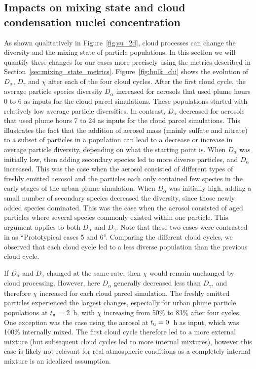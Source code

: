 \documentclass[edeposit,fullpage]{uiucthesis2009}
\begin{document}
\subsection{Impacts on mixing state and cloud condensation nuclei concentration}
As shown qualitatively in Figure~\ref{fig:su_2d}, cloud processes can
change the diversity and the mixing state of particle populations. In
this section we will quantify these changes for our cases more
precisely using the metrics described in
Section~\ref{sec:mixing_state_metrics}. Figure~\ref{fig:bulk_chi}
shows the evolution of $D_\alpha$, $D_\gamma$ and $\chi$ after each of
the four cloud cycles. After the first cloud cycle, the average
particle species diversity $D_\alpha$ increased for aerosols that used
plume hours 0 to 6 as inputs for the cloud parcel simulations. These
populations started with relatively low average particle
diversities. In contrast, $D_\alpha$ decreased for aerosols that used
plume hours 7 to 24 as inputs for the cloud parcel simulations. This
illustrates the fact that the addition of aerosol mass (mainly sulfate
and nitrate) to a subset of particles in a population can lead to a
decrease or increase in average particle diversity, depending on what
the starting point is. When $D_{\alpha}$ was initially low, then
adding secondary species led to more diverse particles, and
$D_{\alpha}$ increased.  This was the case when the aerosol consisted
of different types of freshly emitted aerosol and the particles each
only contained few species in the early stages of the urban plume
simulation. When $D_{\alpha}$ was initially high, adding a small
number of secondary species decreased the diversity, since those newly
added species dominated. This was the case when the aerosol consisted
of aged particles where several species commonly existed within one
particle. This argument applies to both $D_{\alpha}$ and
$D_{\gamma}$. Note that these two cases were contrasted in
\citet{Riemer2013a} as ``Prototypical cases 5 and 6''.  Comparing the
different cloud cycles, we observed that each cloud cycle led to a
less diverse population than the previous cloud cycle.

If $D_{\alpha}$ and $D_{\gamma}$ changed at the same rate, then $\chi$
would remain unchanged by cloud processing. However, here $D_{\alpha}$
generally decreased less than $D_{\gamma}$, and therefore $\chi$
increased for each cloud parcel simulation. The freshly emitted
particles experienced the largest changes, especially for urban plume
particle populations at $t_{\rm u}$ = 2~h, with $\chi$ increasing from
50\% to 83\% after four cycles. One exception was the case using the
aerosol at $t_{\rm u} = 0$~h as input, which was 100\% internally
mixed. The first cloud cycle therefore led to a more external
  mixture (but subsequent cloud cycles led to more internal mixtures),
  however this case is likely not relevant for real atmospheric
  conditions as a completely internal mixture is an idealized
  assumption.
\end{document}
